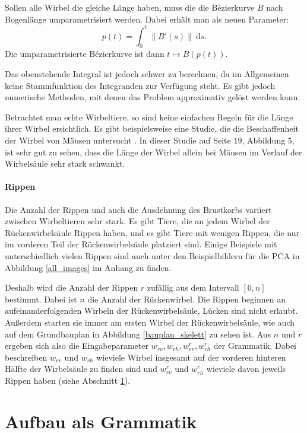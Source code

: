 Sollen alle Wirbel die gleiche Länge haben, muss die 
die Bézierkurve $B$ nach Bogenlänge umparametrisiert werden. Dabei erhält man als neuen Parameter:
\[p(t) = \int_0^t \| B'(s) \| ~\mathrm{d}s. \]
Die umparametrisierte Bézierkurve ist dann $t \mapsto B(p(t))$.

Das obenstehende Integral ist jedoch schwer zu berechnen, da im Allgemeinen keine Stammfunktion des Integranden zur Verfügung steht. Es gibt jedoch numerische Methoden, mit denen das Problem approximativ gelöst werden kann. \cite{ArcLengthParametrization}

Betrachtet man echte Wirbeltiere, so sind keine einfachen Regeln für die Länge ihrer Wirbel ersichtlich. Es gibt beispielsweise eine Studie, die die Beschaffenheit der  Wirbel von Mäusen untersucht \cite{MouseVertebrae}. In dieser Studie auf Seite $19$, Abbildung $5$, ist sehr gut zu sehen, dass die Länge der Wirbel allein bei Mäusen im Verlauf der Wirbelsäule sehr stark schwankt.

\paragraph{Rippen}
Die Anzahl der Rippen und auch die Ausdehnung des Brustkorbs variiert zwischen Wirbeltieren sehr stark. Es gibt Tiere, die an jedem Wirbel der Rückenwirbelsäule Rippen haben, und es gibt Tiere mit wenigen Rippen, die nur im vorderen Teil der Rückenwirbelsäule platziert sind. Einige Beispiele mit unterschiedlich vielen Rippen sind auch unter den Beispielbildern für die PCA in Abbildung \ref{all_images} im Anhang zu finden.

Deshalb wird die Anzahl der Rippen $r$ zufällig aus dem Intervall $ [0, n]$ bestimmt. Dabei ist $n$ die Anzahl der Rückenwirbel.
Die Rippen beginnen an aufeinanderfolgenden Wirbeln der Rückenwirbelsäule, Lücken sind nicht erlaubt. Außerdem starten sie immer am ersten Wirbel der Rückenwirbelsäule, wie auch auf dem Grundbauplan in Abbildung \ref{bauplan_skelett} zu sehen ist. Aus $n$ und $r$ ergeben sich also die Eingabeparameter $w_{rv}, w_{rh}, w_{rv}^r, w_{rh}^r$ der Grammatik. Dabei beschreiben $w_{rv}$ und $w_{rh}$ wieviele Wirbel insgesamt auf der vorderen \bzw hinteren Hälfte der Wirbelsäule zu finden sind und $w_{rv}^r$ und $w_{rh}^r$ wieviele davon jeweils Rippen haben (siehe Abschnitt \ref{section:grammar}).


\section{Aufbau als Grammatik}
\label{section:grammar}

